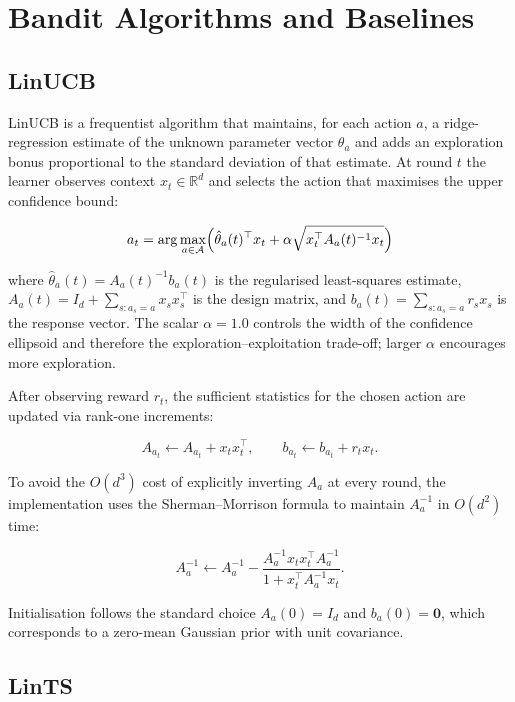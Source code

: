 \section{Bandit Algorithms and Baselines}\label{bandit-algorithms-and-baselines}

\subsection{LinUCB}\label{linucb}

LinUCB \citep{Li2010} is a frequentist algorithm that maintains, for each action \(a\), a ridge-regression estimate of the unknown parameter vector \(\theta_a\) and adds an exploration bonus proportional to the standard deviation of that estimate. At round \(t\) the learner observes context \(x_t \in \mathbb{R}^d\) and selects the action that maximises the upper confidence bound:

\[a_t = \arg\max_{a \in \mathcal{A}} \Bigl( \hat\theta_a(t)^\top x_t + \alpha \sqrt{x_t^\top A_a(t)^{-1} x_t} \Bigr)\]

where \(\hat\theta_a(t) = A_a(t)^{-1} b_a(t)\) is the regularised least-squares estimate, \(A_a(t) = I_d + \sum_{s: a_s = a} x_s x_s^\top\) is the design matrix, and \(b_a(t) = \sum_{s: a_s = a} r_s x_s\) is the response vector. The scalar \(\alpha = 1.0\) controls the width of the confidence ellipsoid and therefore the exploration--exploitation trade-off; larger \(\alpha\) encourages more exploration.

After observing reward \(r_t\), the sufficient statistics for the chosen action are updated via rank-one increments:

\[A_{a_t} \leftarrow A_{a_t} + x_t x_t^\top, \qquad b_{a_t} \leftarrow b_{a_t} + r_t x_t.\]

To avoid the \(O(d^3)\) cost of explicitly inverting \(A_a\) at every round, the implementation uses the Sherman--Morrison formula to maintain \(A_a^{-1}\) in \(O(d^2)\) time:

\[A_a^{-1} \leftarrow A_a^{-1} - \frac{A_a^{-1} x_t x_t^\top A_a^{-1}}{1 + x_t^\top A_a^{-1} x_t}.\]

Initialisation follows the standard choice \(A_a(0) = I_d\) and \(b_a(0) = \mathbf{0}\), which corresponds to a zero-mean Gaussian prior with unit covariance.

\subsection{LinTS}\label{lints}

